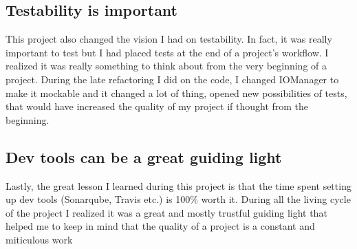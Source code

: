 \documentclass[11pt]{article}
\begin{document}
\subsection{Testability is important}
This project also changed the vision I had on testability. In fact, it was really important to test but I had placed tests at the end of a project's workflow. I realized it was really something to think about from the very beginning of a project. During the late refactoring I did on the code, I changed IOManager to make it mockable and it changed a lot of thing, opened new possibilities of tests, that would have increased the quality of my project if thought from the beginning.

\subsection{Dev tools can be a great guiding light}
Lastly, the great lesson I learned during this project is that the time spent setting up dev tools (Sonarqube, Travis etc.) is 100\% worth it. During all the living cycle of the project I realized it was a great and mostly trustful guiding light that helped me to keep in mind that the quality of a project is a constant and miticulous work
\end{document}
